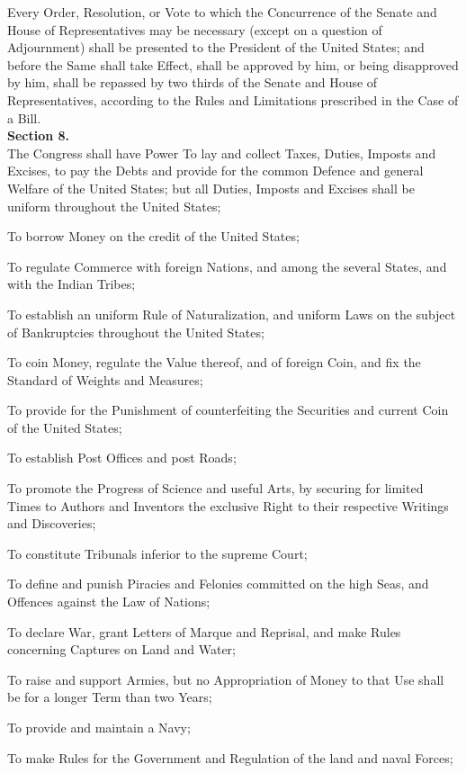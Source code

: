 Every Order, Resolution, or Vote to which the Concurrence of the Senate and House of Representatives may be necessary (except on a question of Adjournment) shall be presented to the President of the United States; and before the Same shall take Effect, shall be approved by him, or being disapproved by him, shall be repassed by two thirds of the Senate and House of Representatives, according to the Rules and Limitations prescribed in the Case of a Bill.\\[0.01in]

{\large \textbf{Section 8.}}\\[0.01in]

The Congress shall have Power To lay and collect Taxes, Duties, Imposts and Excises, to pay the Debts and provide for the common Defence and general Welfare of the United States; but all Duties, Imposts and Excises shall be uniform throughout the United States;

To borrow Money on the credit of the United States;

To regulate Commerce with foreign Nations, and among the several States, and with the Indian Tribes;

To establish an uniform Rule of Naturalization, and uniform Laws on the subject of Bankruptcies throughout the United States;

To coin Money, regulate the Value thereof, and of foreign Coin, and fix the Standard of Weights and Measures;

To provide for the Punishment of counterfeiting the Securities and current Coin of the United States;

To establish Post Offices and post Roads;

To promote the Progress of Science and useful Arts, by securing for limited Times to Authors and Inventors the exclusive Right to their respective Writings and Discoveries;

To constitute Tribunals inferior to the supreme Court;

To define and punish Piracies and Felonies committed on the high Seas, and Offences against the Law of Nations;

To declare War, grant Letters of Marque and Reprisal, and make Rules concerning Captures on Land and Water;

To raise and support Armies, but no Appropriation of Money to that Use shall be for a longer Term than two Years;

To provide and maintain a Navy;

To make Rules for the Government and Regulation of the land and naval Forces;


